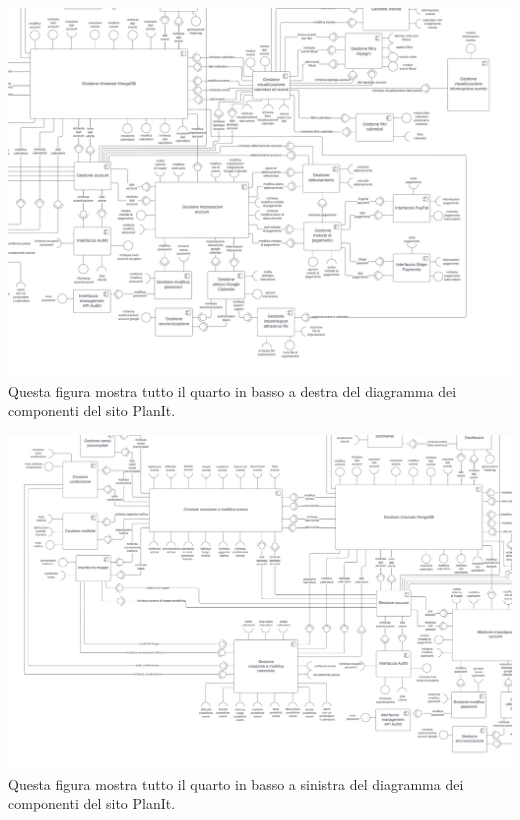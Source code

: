 \begin{center}
    \includegraphics[width=1\textwidth,height=0.4\textheight]{img/Diagrammi/Componenti/P3_Diagramma_dei_componenti.png}
    Questa figura mostra tutto il quarto in basso a destra del diagramma dei componenti del sito PlanIt.
\end{center}
\begin{center}
    \includegraphics[width=1\textwidth,height=0.4\textheight]{img/Diagrammi/Componenti/P4_Diagramma_dei_componenti.png}
    Questa figura mostra tutto il quarto in basso a sinistra del diagramma dei componenti del sito PlanIt.
\end{center}
\newpage
